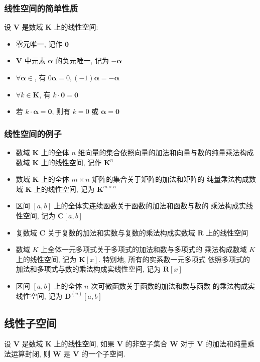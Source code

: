 \documentclass{article}
\begin{document}
			\subsubsection{线性空间的简单性质}
				设 $\boldsymbol V$ 是数域 $\mathbf K$ 上的线性空间:
				\begin{itemize}
					\item 零元唯一, 记作 $\mathbf{0}$
					\item $\boldsymbol V$ 中元素 $\boldsymbol \alpha$ 的负元唯一, 记为 $-\boldsymbol \alpha$
					\item $\forall \boldsymbol \alpha \in $, 有 $0 \boldsymbol \alpha=0,(-1) \boldsymbol \alpha=-\boldsymbol \alpha$
					\item $\forall k \in \mathbf K$, 有 $k \cdot \mathbf{0}=\mathbf{0}$
					\item 若 $k \cdot \boldsymbol{\alpha}=\mathbf{0}$, 则有 $k=0$ 或 $\boldsymbol{\alpha}=\mathbf{0}$
				\end{itemize}
			\subsubsection{线性空间的例子}
				\begin{itemize}
					\item 数域 $\mathbf K$ 上的全体 $n$ 维向量的集合依照向量的加法和向量与数的纯量乘法构成数域 $\mathbf K$ 上的线性空间, 记作 $\mathbf K^{n}$
					\item 数域 $\mathbf K$ 上的全体 $m \times n$ 矩阵的集合关于矩阵的加法和矩阵的 纯量乘法构成数域 $\mathbf K$ 上的线性空间, 记为 $\mathbf K^{m \times n}$
					\item 区间 $[a, b]$ 上的全体实连续函数关于函数的加法和函数与数的 乘法构成实线性空间, 记为 $\mathbf C[a, b]$
					\item 复数域 $\mathbf{C}$ 关于复数的加法和实数与复数的乘法构成实数域 $\mathbf{R}$ 上的线性空间
					\item 数域 $K$ 上全体一元多项式关于多项式的加法和数与多项式的 乘法构成数域 $K$ 上的线性空间, 记为 $\mathbf K[x]$. 特别地, 所有的实系数一元多项式 依照多项式的加法和多项式与数的乘法构成实线性空间, 记为 $\mathbf{R}[x]$
					\item 区间 $[a, b]$ 上的全体 $n$ 次可微函数关于函数的加法和数与函数 的乘法构成实线性空间, 记为 $\mathbf D^{(n)}[a, b]$
				\end{itemize}
			\subsection{线性子空间}
				设 $\boldsymbol V$ 是数域 $\mathbf K$ 上的线性空间, 如果 $\boldsymbol V$ 的非空子集合 $\boldsymbol W$ 对于 $\boldsymbol V$ 的加法和纯量乘法运算封闭, 则 $\boldsymbol W$ 是 $\boldsymbol V$ 的一个子空间.
\end{document}
